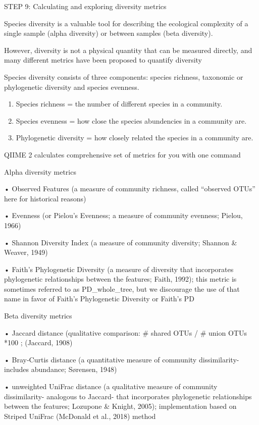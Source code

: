\documentclass[
]{book}
\begin{document}
STEP 9: Calculating and exploring diversity metrics

Species diversity is a valuable tool for describing the ecological complexity of a single sample (alpha diversity) or between samples (beta diversity).

However, diversity is not a physical quantity that can be measured directly, and many different metrics have been proposed to quantify diversity

Species diversity consists of three components: species richness, taxonomic or phylogenetic diversity and species evenness.

\begin{enumerate}
\def\labelenumi{\arabic{enumi}.}
\item
  Species richness = the number of different species in a community.
\item
  Species evenness = how close the species abundencies in a community are.
\item
  Phylogenetic diversity = how closely related the species in a community are.
\end{enumerate}

QIIME 2 calculates comprehensive set of metrics for you with one command

Alpha diversity metrics

• Observed Features (a measure of community richness, called ``observed OTUs'' here for historical reasons)

• Evenness (or Pielou's Evenness; a measure of community evenness; Pielou, 1966)

• Shannon Diversity Index (a measure of community diversity; Shannon \& Weaver, 1949)

• Faith's Phylogenetic Diversity (a measure of diversity that incorporates phylogenetic relationships between the features; Faith, 1992); this metric is sometimes referred to as PD\_whole\_tree, but we discourage the use of that name in favor of Faith's Phylogenetic Diversity or Faith's PD

Beta diversity metrics

• Jaccard distance (qualitative comparison: \# shared OTUs / \# union OTUs *100 ; (Jaccard, 1908)

• Bray‐Curtis distance (a quantitative measure of community dissimilarity- includes abundance; Sørensen, 1948)

• unweighted UniFrac distance (a qualitative measure of community dissimilarity- analogous to Jaccard- that incorporates phylogenetic relationships between the features; Lozupone \& Knight, 2005); implementation based on Striped UniFrac (McDonald et al., 2018) method
\end{document}
